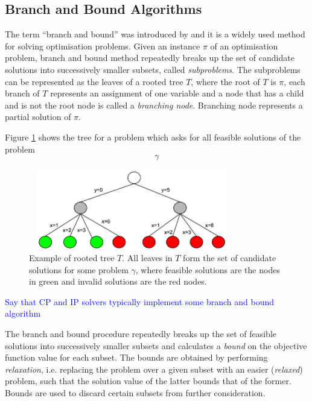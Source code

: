 \documentclass{mprop}
\theoremstyle{definition}
\begin{document}
\subsection{Branch and Bound Algorithms}
\label{branchandbound}
The term ``branch and bound'' was introduced by \citet{Little63} and it is a widely used method for solving optimisation problems. Given an instance $\pi$ of an optimisation problem, branch and bound method repeatedly breaks up the set of candidate solutions into successively smaller subsets, called \textit{subproblems}. The subproblems can be represented as the leaves of a rooted tree $T$, where the root of $T$ is $\pi$, each branch of $T$ represents an assignment of one variable and a node that has a child and is not the root node is called a \textit{branching node}. Branching node represents a partial solution of $\pi$.

Figure \ref{fig:bandb} shows the tree for a problem which asks for all feasible solutions of the problem 
$$\gamma$$

\begin{figure}
\centering
\includegraphics[width=9cm, height=3.5cm]{images/bandb.png}
\caption{Example of rooted tree $T$. All leaves in $T$ form the set of candidate solutions for some problem $\gamma$, where feasible solutions are the nodes in green and invalid solutions are the red nodes.}
\label{fig:bandb}
\end{figure}

\textcolor{blue}{Say that CP and IP solvers typically implement some branch and bound algorithm}

The branch and bound procedure repeatedly breaks up the set of feasible solutions into successively smaller subsets and calculates a \textit{bound} on the objective function value for each subset. The bounds are obtained by performing \textit{relaxation}, i.e. replacing the problem over a given subset with an easier (\textit{relaxed}) problem, such that the solution value of the latter bounds that of the former. Bounds are used to discard certain subsets from further consideration.
\end{document}
